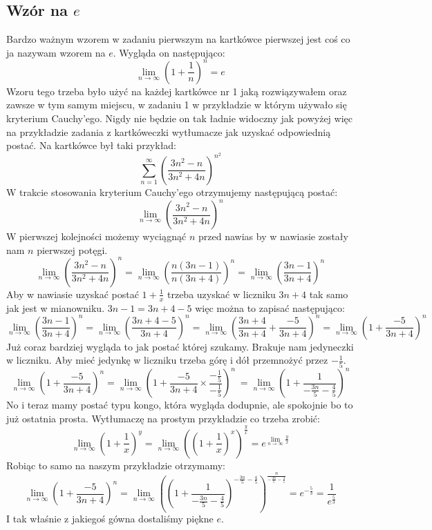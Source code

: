 \documentclass[11pt]{article}
\begin{document}
\subsection{Wzór na $e$}
\vbox{
    Bardzo ważnym wzorem w zadaniu pierwszym na kartkówce pierwszej
    jest coś co ja nazywam wzorem na $e$. Wygląda on następująco:
    \[\lim_{n\to\infty}(1 + \frac{1}{n})^n = e\]
    Wzoru tego trzeba było użyć na każdej kartkówce nr 1 jaką rozwiązywałem
    oraz zawsze w tym samym miejscu, w zadaniu 1
    w przykładzie w którym używało się kryterium Cauchy'ego. Nigdy nie będzie on
    tak ładnie widoczny jak powyżej więc na przykładzie zadania z kartkóweczki
    wytłumacze jak uzyskać odpowiednią postać. Na kartkówce był taki 
    przykład:
    \[
        \sum_{n=1}^{\infty}(\frac{3n^2 - n}{3n^2 + 4n})^{n^2}
    \]
    W trakcie stosowania kryterium Cauchy'ego otrzymujemy następującą postać:
    \[\lim_{n\to\infty}(\frac{3n^2 - n}{3n^2 + 4n})^n\]
    W pierwszej kolejności możemy wyciągnąć $n$ przed nawias by w nawiasie zostały
    nam $n$ pierwszej potęgi.
    \[\lim_{n\to\infty}(\frac{3n^2 - n}{3n^2 + 4n})^n = 
        \lim_{n\to\infty}(\frac{n(3n - 1)}{n(3n + 4)})^n =
        \lim_{n\to\infty}(\frac{3n - 1}{3n + 4})^n
    \]
    Aby w nawiasie uzyskać postać $1 + \frac{1}{x}$
    trzeba uzyskać w liczniku $3n + 4$ tak samo jak jest w mianowniku.
    $3n - 1 = 3n + 4 - 5$ więc można to zapisać następująco:
    \[\lim_{n\to\infty}(\frac{3n - 1}{3n + 4})^n = 
        \lim_{n\to\infty}(\frac{3n + 4 - 5}{3n + 4})^n =
        \lim_{n\to\infty}(\frac{3n + 4}{3n + 4} + \frac{-5}{3n + 4})^n = 
        \lim_{n\to\infty}(1 + \frac{-5}{3n + 4})^n
    \]
    Już coraz bardziej wygląda to jak postać której szukamy. Brakuje nam jedyneczki w liczniku.
    Aby mieć jedynkę w liczniku trzeba górę i dół przemnożyć przez $-\frac{1}{5}$.
    \[
        \lim_{n\to\infty}(1 + \frac{-5}{3n + 4})^n = 
        \lim_{n\to\infty}(1 + \frac{-5}{3n + 4} \times \frac{-\frac{1}{5}}{-\frac{1}{5}})^n\ = 
        \lim_{n\to\infty}(1 + \frac{1}{-\frac{3n}{5} - \frac{4}{5}})^n
    \]
}
\vbox{
    No i teraz mamy postać typu kongo, która wygląda dodupnie, ale spokojnie bo to
    już ostatnia prosta. Wytłumaczę na prostym przykładzie co trzeba zrobić:
    \[
        \lim_{n\to\infty}(1 + \frac{1}{x})^y =
        \lim_{n\to\infty}((1 + \frac{1}{x})^x)^{\frac{y}{x}} = 
        e^{\lim_{n\to\infty}\frac{y}{x}}
    \]
    Robiąc to samo na naszym przykładzie otrzymamy:
    \[
        \lim_{n\to\infty}(1 + \frac{-5}{3n + 4})^n =
        \lim_{n\to\infty}((1 + \frac{1}{-\frac{3n}{5} - \frac{4}{5}})^{-\frac{3n}{5} - \frac{4}{5}})^{\frac{n}{-\frac{3n}{5} - \frac{4}{5}}} = 
        e^{-\frac{5}{3}} = \frac{1}{e^{\frac{5}{3}}}
    \]
    I tak właśnie z jakiegoś gówna dostaliśmy piękne $e$.
}
\end{document}
